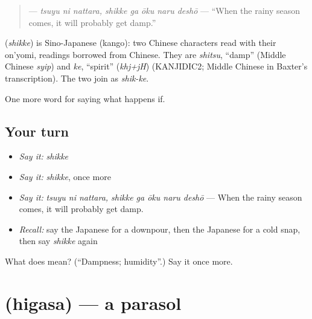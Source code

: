 \begin{quote}
\textbf{   } — \emph{tsuyu ni nattara, shikke ga ōku naru deshō} — \textquotedblleft{}When the rainy season comes, it will probably get damp.\textquotedblright{}
\end{quote}

\begin{cousinweb}
\textbf{} (\emph{shikke}) is Sino-Japanese (kango): two Chinese characters read with their on'yomi, readings borrowed from Chinese. They are \emph{shitsu}, \textquotedblleft{}damp\textquotedblright{} (Middle Chinese \emph{syip}) and \emph{ke}, \textquotedblleft{}spirit\textquotedblright{} (\emph{khj+jH}) (KANJIDIC2; Middle Chinese in Baxter's transcription). The two join as \emph{shik-ke}.
\end{cousinweb}

\begin{grammarlens}[title={What you've built}]
One more word for saying what happens if.
\end{grammarlens}

\subsection*{Your turn}
\begin{itemize}
\raggedright
  \item \emph{Say it:} \emph{shikke}
  \item \emph{Say it:} \emph{shikke}, once more
  \item \emph{Say it:} \emph{tsuyu ni nattara, shikke ga ōku naru deshō} — When the rainy season comes, it will probably get damp.
  \item \emph{Recall:} say the Japanese for a downpour, then the Japanese for a cold snap, then say \emph{shikke} again
\end{itemize}

\begin{tcolorbox}[breakable,colback=teal!4,colframe=teal!35!black,title={Before you move on}]
What does  mean? (\textquotedblleft{}Dampness; humidity\textquotedblright{}.) Say it once more.
\end{tcolorbox}
\section[\texorpdfstring{\ja{ひがさ} (higasa)}{ひがさ (higasa)}]{ (higasa) — a parasol}

